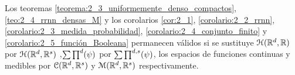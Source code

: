 \begin{corolario}\label{corolario:2_6}
    Los teoremas 
    \ref{teorema:2_3_uniformemente_denso_compactos},
    \ref{teo:2_4_rrnn_densas_M} 
    y los corolarios
    \ref{cor:2_1}, 
    \ref{corolario:2_2_rrnn},
    \ref{corolario:2_3_medida_probabilidad},
    \ref{corolario:2_4_conjunto_finito}
    y 
    \ref{corolario:2_5_función_Booleana}
    permanecen válidos si se sustituye $\mathcal{H}(\mathbb{R}^d,\mathbb{R})$ por $\mathcal{H}(\mathbb{R}^d,\mathbb{R}^s)$
    ,$\sum \prod^d (\psi)$ por $\sum \prod^{d,s} (\psi)$, 
    los espacios de funciones continuas y medibles por $\mathcal{C}(\mathbb{R}^d ,\mathbb{R}^s)$ y $\mathcal{M}(\mathbb{R}^d , \mathbb{R}^s)$ respectivamente.
\end{corolario}



